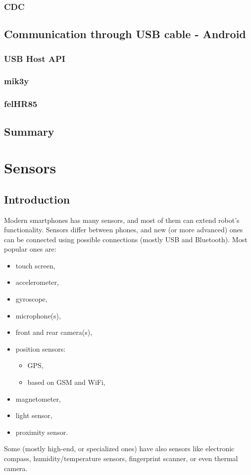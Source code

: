\documentclass[openany]{mgr} %
\begin{document}
\subsection{CDC}

\section{Communication through USB cable - Android}
\subsection{USB Host API}
\subsection{mik3y}
\subsection{felHR85}

\section{Summary}

\chapter{Sensors}

\section{Introduction}
Modern smartphones has many sensors, and most of them can extend robot's
functionality. Sensors differ between phones, and new (or more advanced) ones can
be connected using possible connections (mostly USB and Bluetooth).
Most popular ones are:
\begin{itemize}
  \item touch screen,
  \item accelerometer,
  \item gyroscope,
  \item microphone(s),
  \item front and rear camera(s),
  \item position sensors:
  \begin{itemize}
    \item GPS,
    \item based on GSM and WiFi,
  \end{itemize}
  \item magnetometer,
  \item light sensor,
  \item proximity sensor.
\end{itemize}
Some (mostly high-end, or specialized ones) have also sensors like electronic
compass, humidity/temperature sensors, fingerprint scanner, or even thermal
camera.
\end{document}
